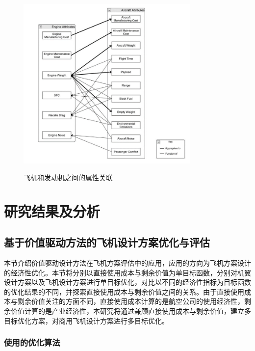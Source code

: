 \documentclass[12pt,a4paper]{report}
\begin{document}
\begin{figure}[ht!]
  \centering
  \includegraphics[width=0.8\textwidth]{aircraft-engine-integration.png}\\
  \caption{飞机和发动机之间的属性关联}
  \label{fig_integration}
\end{figure}


\chapter{研究结果及分析}

\section{基于价值驱动方法的飞机设计方案优化与评估}

本节介绍价值驱动设计方法在飞机方案评估中的应用，应用的方向为飞机方案设计的经济性优化。本节将分别以直接使用成本与剩余价值为单目标函数，分别对机翼设计方案以及飞机设计方案进行单目标优化，对比以不同的经济性指标为目标函数的优化结果的不同，并探索直接使用成本与剩余价值之间的关系。由于直接使用成本与剩余价值关注的方面不同，直接使用成本计算的是航空公司的使用经济性，剩余价值计算的是产业经济性，本研究将通过兼顾直接使用成本与剩余价值，建立多目标优化方案，对商用飞机设计方案进行多目标优化。

\subsection{使用的优化算法}
\end{document}
